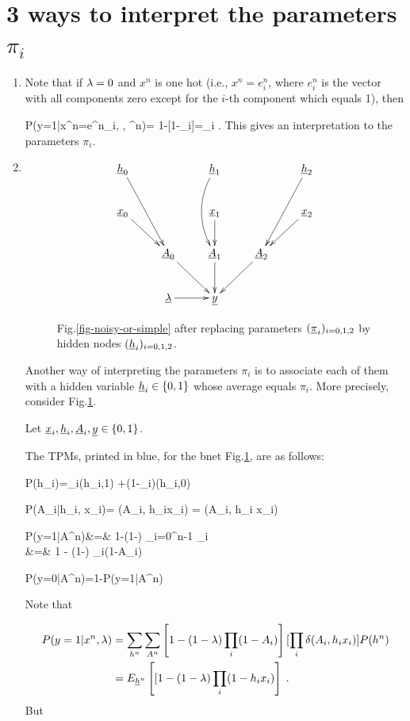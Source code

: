 \section{3 ways to interpret
the parameters $\pi_i$}
\begin{enumerate}
\item
Note that if $\lambda=0$ and $x^n$ is one hot (i.e., 
$x^n=e^n_i$, where $e^n_i$
is the vector with all components 
zero except for the $i$-th
component which equals 1), then

\beq
P(y=1|x^n=e^n_i, , \pi^n)=
1-[1-\pi_i]=\pi_i
\;.
\eeq
This gives an interpretation to the
parameters $\pi_i$.

\item

\begin{figure}[h!]
$$\xymatrix{
\rvh_0\ar[ddr]
&&\rvh_1\ar@/_1pc/[dd]
&&\rvh_2\ar[ddl]
\\
\rvx_0\ar[rd]
&&\rvx_1\ar[d]
&&\rvx_2\ar[ld]
\\
&\rvA_0\ar[dr]
&\rvA_1\ar[d]
&\rvA_2\ar[dl]
\\
&\ul{\lam}\ar[r]
&\rvy
}$$
\caption{Fig.\ref{fig-noisy-or-simple}
after replacing parameters 
$(\ul{\pi}_i)_{i=0,1,2}$
by 
hidden nodes
$(\rvh_i)_{i=0,1,2}$.}
\label{fig-noisy-or-hid}
\end{figure}


Another way of
interpreting the 
parameters $\pi_i$
is to associate 
each of them with a hidden 
variable
$\rvh_i\in \bool$
whose average equals $\pi_i$.
More precisely, 
consider Fig.\ref{fig-noisy-or-hid}.

Let $\rvx_i, \rvh_i, \rvA_i, \rvy\in \bool$.

The TPMs, printed  in blue, for the
bnet
Fig.\ref{fig-noisy-or-hid},
are as follows:

\beq\color{blue}
P(h_i)=\pi_i\delta(h_i,1)
+(1-\pi_i)\delta(h_i,0)
\eeq

\beq\color{blue}
P(A_i|h_i, x_i)= \delta(A_i, h_i\A x_i)
= \delta(A_i, h_i x_i)
\eeq

\beqa\color{blue}
P(y=1|A^n)&=& 
\color{blue}
1-(1-\lam)
 \A_{i=0}^{n-1}
_i
\\
&=&
\color{blue}
 1 - (1-\lam) \prod_i(1-A_i)
\eeqa

\beq\color{blue}
P(y=0|A^n)=1-P(y=1|A^n)
\eeq


Note that

\begin{align}
P(y=1|x^n, \lam)
&=
\sum_{h^n}
\sum_{A^n}
\left[
 1 - (1-\lam) 
\prod_i(1-A_i)\right]
[\prod_i \delta(A_i, h_i x_i)]P(h^n)
\\
&=
E_{\rvh^n}\left[
[ 1 - (1-\lam) \prod_i(1-h_i x_i)
\right]
\;.
\end{align}
But



\end{enumerate}

